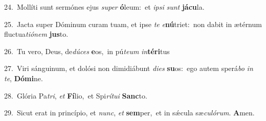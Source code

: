 {\numbfont\textcolor{\numbcolor}{24.}}~Mollíti sunt sermónes ejus \textit{su}\-\textit{per} \textbf{ó}\-leum:~\star et \textit{ip}\-\textit{si} \textit{sunt} \textbf{já}\-\textbf{cu}la.\par
{\numbfont\textcolor{\numbcolor}{25.}}~Jacta super Dóminum curam tuam, et ipse \textit{te} \textit{e}\-\textbf{nú}triet:~\star non dabit in ætérnum fluctua\-\textit{ti}\-\textit{ó}\textit{nem} \textbf{jus}\-to.\par
{\numbfont\textcolor{\numbcolor}{26.}}~Tu vero, Deus, de\-\textit{dú}\-\textit{ces} \textbf{e}\-os,~\star in pú\-\textit{te}\-\textit{um} \textit{in}\-\textbf{tér}\textbf{i}tus\par
{\numbfont\textcolor{\numbcolor}{27.}}~Viri sánguinum, et dolósi non dimidiábunt \textit{di}\-\textit{es} \textbf{su}\-os:~\star ego autem sperá\textit{bo} \textit{in} \textit{te}\-, \textbf{Dó}\-\textbf{mi}ne.\par
{\numbfont\textcolor{\numbcolor}{28.}}~Glória Pa\-\textit{tri}\-, \textit{et} \textbf{Fí}\-lio,~\star et Spi\-\textit{rí}\-\textit{tu}\textit{i} \textbf{Sanc}\-to.\par
{\numbfont\textcolor{\numbcolor}{29.}}~Sicut erat in princípio, et \textit{nunc}\-, \textit{et} \textbf{sem}\-per,~\star et in sǽcula sæ\-\textit{cu}\-\textit{ló}\textit{rum}. \textbf{A}\-men.\par
